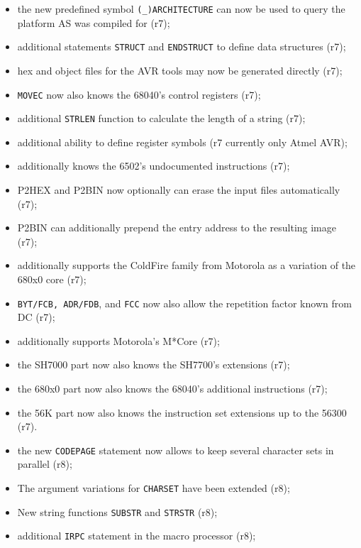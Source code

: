 \documentclass[12pt,twoside]{report}
\newcommand{\tty}[1]{{\tt #1}}
\newcommand{\asname}{{AS}}
\newcommand{\predefsym}[1]{{\tt (\_)#1}}
\begin{document}
\begin{itemize}
{\begin{itemize}
      \item{the new predefined symbol \predefsym{ARCHITECTURE} can now be
            used to query the platform \asname{} was compiled for (r7);}
      \item{additional statements \tty{STRUCT} and \tty{ENDSTRUCT}
            to define data structures (r7);}
      \item{hex and object files for the AVR tools may now be generated
            directly (r7);}
      \item{\tty{MOVEC} now also knows the 68040's control registers
            (r7);}
      \item{additional \tty{STRLEN} function to calculate the length
            of a string (r7);}
      \item{additional ability to define register symbols (r7 currently
            only Atmel AVR);}
      \item{additionally knows the 6502's undocumented instructions (r7);}
      \item{P2HEX and P2BIN now optionally can erase the input files
            automatically (r7);}
      \item{P2BIN can additionally prepend the entry address to the
            resulting image (r7);}
      \item{additionally supports the ColdFire family from Motorola as a
            variation of the 680x0 core (r7);}
      \item{\tty{BYT/FCB, ADR/FDB}, and \tty{FCC} now also allow the
            repetition factor known from DC (r7);}
      \item{additionally supports Motorola's M*Core (r7);}
      \item{the SH7000 part now also knows the SH7700's
            extensions (r7);}
      \item{the 680x0 part now also knows the 68040's additional
            instructions (r7);}
      \item{the 56K part now also knows the instruction set extensions
            up to the 56300 (r7).}
      \item{the new \tty{CODEPAGE} statement now allows to keep several
            character sets in parallel (r8);}
      \item{The argument variations for \tty{CHARSET} have been extended
            (r8);}
      \item{New string functions \tty{SUBSTR} and \tty{STRSTR} (r8);}
      \item{additional \tty{IRPC} statement in the macro processor (r8);}

\end{itemize}}
\end{itemize}
\end{document}
